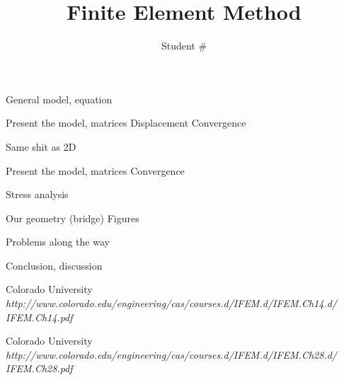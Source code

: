 \documentclass[9pt]{extarticle}
\title{Finite Element Method}
\author{Student \# }
\begin{document}
\maketitle



General model, equation




Present the model, matrices
Displacement
Convergence





Same shit as 2D

Present the model, matrices
Convergence


Stress analysis



Our geometry (bridge)
Figures

Problems along the way


Conclusion, discussion



\begin{thebibliography}{2}

	Colorado University\\
	\emph{http://www.colorado.edu/engineering/cas/courses.d/IFEM.d/IFEM.Ch14.d/\\IFEM.Ch14.pdf}


	Colorado University\\
	\emph{http://www.colorado.edu/engineering/cas/courses.d/IFEM.d/IFEM.Ch28.d/\\IFEM.Ch28.pdf}	
\end{thebibliography}
\end{document}
